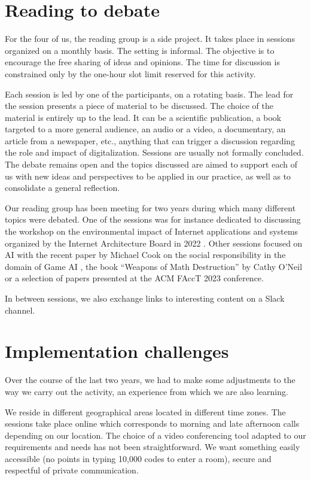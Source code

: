 \documentclass[conference]{IEEEtran}
\begin{document}
\section{Reading to debate}

For the  four of  us, the reading  group is a  side project.  It takes
place  in  sessions organized  on  a  monthly  basis. The  setting  is
informal. The objective is to encourage  the free sharing of ideas and
opinions. The time for discussion  is constrained only by the one-hour
slot limit reserved for this activity.

Each  session  is led  by  one  of  the  participants, on  a  rotating
basis. The  lead for the  session presents a  piece of material  to be
discussed. The choice  of the material is entirely up  to the lead. It
can be  a scientific publication,  a book  targeted to a  more general
audience,  an audio  or  a video,  a documentary,  an  article from  a
newspaper, etc., anything that can  trigger a discussion regarding the
role and impact  of digitalization. Sessions are  usually not formally
concluded. The debate remains open  and the topics discussed are aimed
to support each of us with new ideas and perspectives to be applied in
our practice, as well as to consolidate a general reflection.

Our reading  group has been  meeting for  two years during  which many
different topics  were debated. One  of the sessions was  for instance
dedicated to  discussing the workshop  on the environmental  impact of
Internet   applications  and   systems  organized   by  the   Internet
Architecture Board in 2022 \cite{IAB22}.  Other sessions focused on AI
with the recent paper by Michael  Cook on the social responsibility in
the  domain  of Game  AI  \cite{Cook21},  the  book “Weapons  of  Math
Destruction” by  Cathy O’Neil  \cite{WMD16} or  a selection  of papers
presented at the ACM FAccT 2023 conference.

In between sessions, we also  exchange links to interesting content on
a Slack channel.

\section{Implementation challenges}

Over the course of the last two years, we had to make some adjustments
to the way we carry out the  activity, an experience from which we are
also learning.

We reside  in different geographical  areas located in  different time
zones. The sessions take place online which corresponds to morning and
late afternoon calls depending on our  location. The choice of a video
conferencing tool adapted  to our requirements and needs  has not been
straightforward.  We want  something easily  accessible (no  points in
typing 10,000 codes to enter a room), secure and respectful of private
communication.
\end{document}
